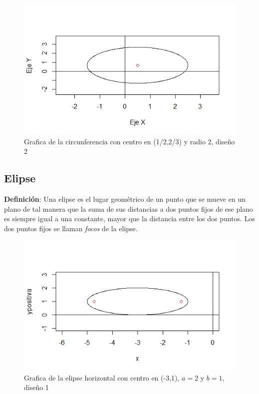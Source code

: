 \documentclass[12pt,a4paper]{article} %
\begin{document}
\begin{figure}
\centering
\includegraphics[scale=0.75]{Circunfe3.png}
\caption{Grafica de la circunferencia con centro en (1/2,2/3) y radio 2, diseño 2}
\end{figure}

\subsection{Elipse}

\textbf{Definici\'{o}n}: Una elipse es el lugar geométrico de un punto que se mueve en un plano de tal manera que la suma de sus distancias a dos puntos fijos de ese plano es siempre igual a una constante, mayor que la distancia entre los dos puntos. Los dos puntos fijos se llaman \textit{focos} de la elipse. 

\begin{figure}
\centering
\includegraphics[scale=0.75]{Elipse2.png}
\caption{Grafica de la elipse horizontal con centro en (-3,1), $a = 2$ y $b = 1$, diseño 1}
\end{figure}
\end{document}
